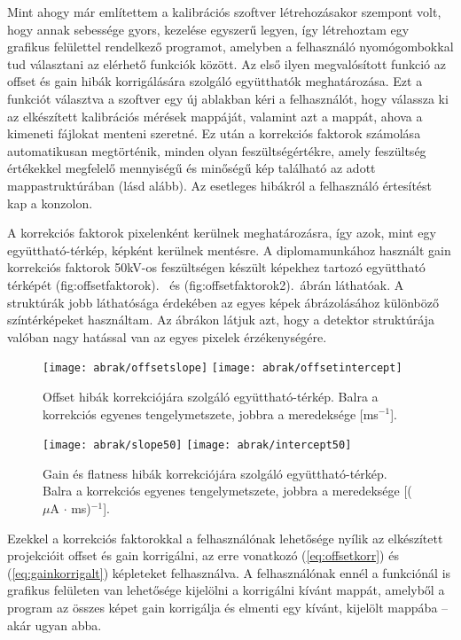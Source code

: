 \documentclass[a4paper,12pt]{article}
\begin{document}
Mint ahogy már említettem  %
 a kalibrációs szoftver létrehozásakor szempont volt, hogy annak sebessége gyors, kezelése egyszerű legyen, így létrehoztam egy grafikus felülettel rendelkező programot, amelyben a felhasználó nyomógombokkal tud választani az elérhető funkciók között. Az első ilyen megvalósított funkció az offset és gain hibák korrigálására szolgáló együtthatók meghatározása. Ezt a funkciót választva a szoftver egy új ablakban kéri a felhasználót, hogy  válassza ki az elkészített kalibrációs mérések mappáját, valamint azt a mappát, ahova a kimeneti fájlokat menteni szeretné. Ez után a korrekciós faktorok számolása automatikusan megtörténik, minden olyan feszültségértékre, amely feszültség értékekkel megfelelő mennyiségű és minőségű kép található az adott mappastruktúrában (lásd alább). Az esetleges hibákról a felhasználó értesítést kap a konzolon.
 
 
 

A korrekciós faktorok  pixelenként kerülnek meghatározásra, így azok, mint egy együttható-térkép, képként  kerülnek mentésre.
 A diplomamunkához használt gain korrekciós faktorok 50kV-os feszültségen készült képekhez tartozó együttható térképét \aref({fig:offsetfaktorok}).~ és \aref({fig:offsetfaktorok2}).~ábrán láthatóak. A struktúrák jobb láthatósága érdekében az egyes képek ábrázolásához különböző színtérképeket használtam. Az ábrákon látjuk azt, hogy a detektor struktúrája valóban nagy hatással van az egyes pixelek érzékenységére. 
 
 
 \begin{figure}[htbp]
\center
\texttt{[image: abrak/offsetslope]}
\texttt{[image: abrak/offsetintercept]}
\caption{Offset hibák korrekciójára szolgáló együttható-térkép. Balra a korrekciós egyenes tengelymetszete, jobbra a meredeksége [ms$^{-1}$].}
\label{fig:offsetfaktorok}
\end{figure}

 
 
  \begin{figure}[htbp]
\center
\texttt{[image: abrak/slope50]}
\texttt{[image: abrak/intercept50]}
\caption{Gain és flatness hibák korrekciójára szolgáló együttható-térkép. Balra a korrekciós egyenes tengelymetszete, jobbra a meredeksége [($\mu$A $\cdot$ ms)$^{-1}$].}
\label{fig:offsetfaktorok2}
\end{figure}

 
 

 Ezekkel a korrekciós faktorokkal a felhasználónak lehetősége nyílik az elkészített projekcióit offset és gain korrigálni, az erre vonatkozó (\ref{eq:offsetkorr}) és (\ref{eq:gainkorrigalt}) képleteket felhasználva.  A felhasználónak ennél a funkciónál is grafikus felületen van lehetősége kijelölni a korrigálni kívánt mappát, amelyből a program az összes képet gain korrigálja és elmenti egy kívánt, kijelölt mappába -- akár ugyan abba. 
 
\end{document}
